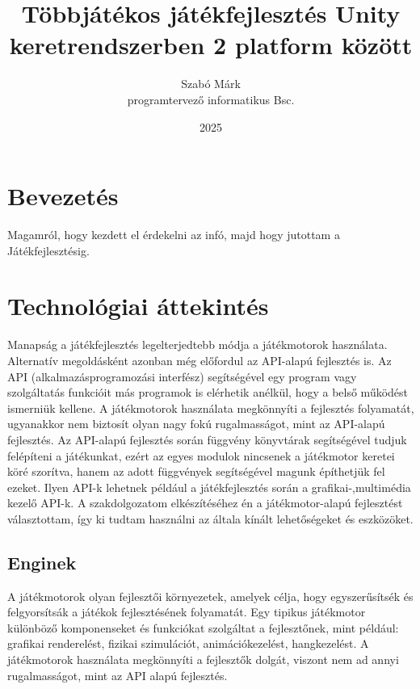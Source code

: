 \documentclass[]{thesis-ekf}
\theoremstyle{definition}
\theoremstyle{remark}
\begin{document}
\title{Többjátékos játékfejlesztés Unity keretrendszerben 2 platform között}
\author{Szabó Márk\\programtervező informatikus Bsc.}
\date{2025}
\maketitle

\tableofcontents

\chapter*{Bevezetés}
Magamról, hogy kezdett el érdekelni az infó, majd hogy jutottam a Játékfejlesztésig.

\chapter{Technológiai áttekintés}

Manapság a játékfejlesztés legelterjedtebb módja a játékmotorok használata. Alternatív megoldásként azonban még előfordul az API-alapú fejlesztés is. Az API (alkalmazásprogramozási interfész) segítségével egy program vagy szolgáltatás funkcióit más programok is elérhetik anélkül, hogy a belső működést ismerniük kellene. A játékmotorok használata megkönnyíti a fejlesztés folyamatát, ugyanakkor nem biztosít olyan nagy fokú rugalmasságot, mint az API-alapú fejlesztés. Az API-alapú fejlesztés során függvény könyvtárak segítségével tudjuk felépíteni a játékunkat, ezért az egyes modulok nincsenek a játékmotor keretei köré szorítva, hanem az adott függvények segítségével magunk építhetjük fel ezeket. Ilyen API-k lehetnek például a játékfejlesztés során a grafikai-,multimédia kezelő API-k. A szakdolgozatom elkészítéséhez én a játékmotor-alapú fejlesztést választottam, így ki tudtam használni az általa kínált lehetőségeket és eszközöket.

\section{Enginek}

A játékmotorok olyan fejlesztői környezetek, amelyek célja, hogy egyszerűsítsék és felgyorsítsák a játékok fejlesztésének folyamatát. Egy tipikus játékmotor különböző komponenseket és funkciókat szolgáltat a fejlesztőnek, mint például: grafikai renderelést, fizikai szimulációt, animációkezelést, hangkezelést. A játékmotorok használata megkönnyíti a fejlesztők dolgát, viszont nem ad annyi rugalmasságot, mint az API alapú fejlesztés. \cite{WikipediaGameEngine}
\end{document}
